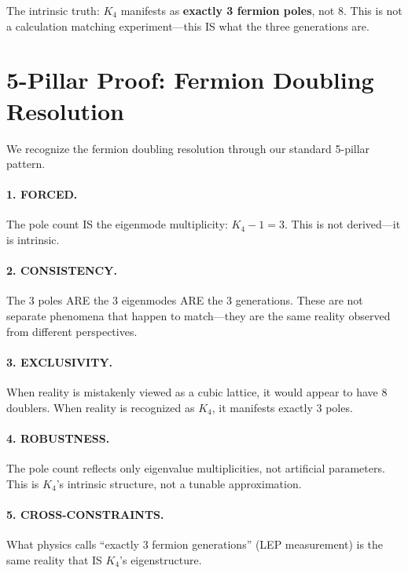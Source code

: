 \documentclass[11pt,a4paper]{book}
\begin{document}
The intrinsic truth: $K_4$ manifests as \textbf{exactly 3 fermion poles}, not 8. This is not a calculation matching experiment—this IS what the three generations are.

\section{5-Pillar Proof: Fermion Doubling Resolution}

We recognize the fermion doubling resolution through our standard 5-pillar pattern.

\paragraph{1. FORCED.} The pole count IS the eigenmode multiplicity: $K_4 - 1 = 3$. This is not derived—it is intrinsic.

\paragraph{2. CONSISTENCY.} The 3 poles ARE the 3 eigenmodes ARE the 3 generations. These are not separate phenomena that happen to match—they are the same reality observed from different perspectives.

\paragraph{3. EXCLUSIVITY.} When reality is mistakenly viewed as a cubic lattice, it would appear to have 8 doublers. When reality is recognized as $K_4$, it manifests exactly 3 poles.

\paragraph{4. ROBUSTNESS.} The pole count reflects only eigenvalue multiplicities, not artificial parameters. This is $K_4$'s intrinsic structure, not a tunable approximation.

\paragraph{5. CROSS-CONSTRAINTS.} What physics calls ``exactly 3 fermion generations'' (LEP measurement) is the same reality that IS $K_4$'s eigenstructure.
\end{document}
